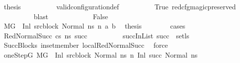 \begin{isabellebody}
\ {\isacharquery}{\kern0pt}thesis\isanewline
\ \ \ \ \ \ \ \ \isamarkupfalse%
\ valid{\isacharunderscore}{\kern0pt}configuration{\isacharunderscore}{\kern0pt}def\isanewline
\ \ \ \ \ \ \ \ \isamarkupfalse%
\ True\ red{\isacharunderscore}{\kern0pt}cfg{\isacharunderscore}{\kern0pt}magic{\isacharunderscore}{\kern0pt}preserved\ \isanewline
\ \ \ \ \ \ \ \ \isamarkupfalse%
\ blast\isanewline
\ \ \ \ \isamarkupfalse%
\isanewline
\ \ \ \ \ \ \isamarkupfalse%
\ False\isanewline
\ \ \ \ \ \ \isamarkupfalse%
\ {\isacartoucheopen}M{\isacharcomma}{\kern0pt}{\isasymLambda}{\isacharcomma}{\kern0pt}{\isasymGamma}{\isacharcomma}{\kern0pt}{\isasymOmega}{\isacharcomma}{\kern0pt}G\ {\isasymturnstile}\ {\isacharparenleft}{\kern0pt}Inl\ src{\isacharunderscore}{\kern0pt}block{\isacharcomma}{\kern0pt}\ Normal\ ns{\isacharparenright}{\kern0pt}\ {\isacharminus}{\kern0pt}n{\isasymrightarrow}\ {\isacharparenleft}{\kern0pt}a{\isacharcomma}{\kern0pt}\ b{\isacharparenright}{\kern0pt}{\isacartoucheclose}\ \isamarkupfalse%
\ {\isacharquery}{\kern0pt}thesis\isanewline
\ \ \ \ \ \ \isamarkupfalse%
\ cases\isanewline
\ \ \ \ \ \ \ \ \isamarkupfalse%
\ {\isacharparenleft}{\kern0pt}RedNormalSucc\ cs\ ns{\isacharprime}{\kern0pt}\ succ{\isacharparenright}{\kern0pt}\isanewline
\ \ \ \ \ \ \ \ \isamarkupfalse%
\ succInList{\isacharcolon}{\kern0pt}\ {\isachardoublequoteopen}succ\ {\isasymin}\ set{\isacharparenleft}{\kern0pt}ls{\isacharparenright}{\kern0pt}{\isachardoublequoteclose}\isanewline
\ \ \ \ \ \ \ \ \ \ \isamarkupfalse%
\ SuccBlocks\ in{\isacharunderscore}{\kern0pt}set{\isacharunderscore}{\kern0pt}member\ local{\isachardot}{\kern0pt}RedNormalSucc{\isacharparenleft}{\kern0pt}{}{\isacharparenright}{\kern0pt}\ \isamarkupfalse%
\ force\isanewline
\ \ \ \ \ \ \ \ \isamarkupfalse%
\ oneStepG{\isacharcolon}{\kern0pt}\ {\isachardoublequoteopen}M{\isacharcomma}{\kern0pt}{\isasymLambda}{\isacharcomma}{\kern0pt}{\isasymGamma}{\isacharcomma}{\kern0pt}{\isasymOmega}{\isacharcomma}{\kern0pt}G\ {\isasymturnstile}\ {\isacharparenleft}{\kern0pt}Inl\ src{\isacharunderscore}{\kern0pt}block{\isacharcomma}{\kern0pt}\ Normal\ ns{\isacharparenright}{\kern0pt}\ {\isacharminus}{\kern0pt}n{\isasymrightarrow}\ {\isacharparenleft}{\kern0pt}Inl\ succ{\isacharcomma}{\kern0pt}\ Normal\ ns{\isacharprime}{\kern0pt}{\isacharparenright}{\kern0pt}{\isachardoublequoteclose}\isanewline

\end{isabellebody}
